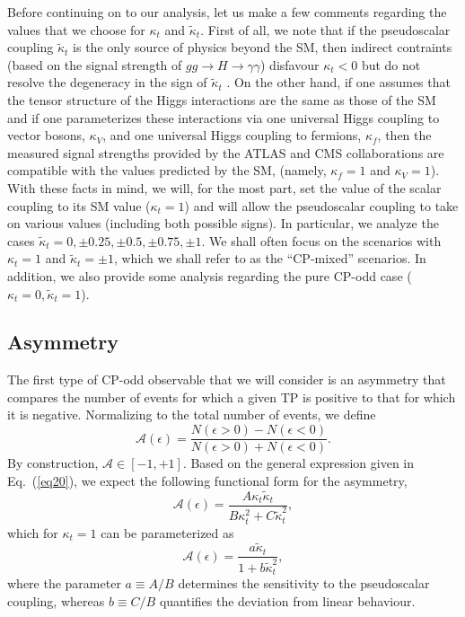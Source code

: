 \documentclass[aps,preprint,tightenlines,floatfix,superscriptaddress,nofootinbib,showpacs]{revtex4-1}
\def\beq{\begin{equation}}
\def\eeq{\end{equation}}
\def\kp{\kappa_t}
\def\kpt{\tilde{\kappa}_t}
\begin{document}
Before continuing on to our analysis, let us make a few comments
regarding the values that we choose for $\kp$ and $\kpt$.
First of all, we note that if the pseudoscalar
coupling $\kpt$ is the only source of physics beyond the SM,
then indirect contraints (based on the signal strength of $gg\to H \to \gamma\gamma$) 
disfavour $\kp < 0$ but do not
resolve the degeneracy in the sign of $\kpt$ \cite{Guadagnoli}. On
the other hand, if one assumes that the tensor structure of the
Higgs interactions are the
same as those of the SM and if one parameterizes these interactions via
one universal Higgs coupling to vector bosons, $\kappa_V$, and one
universal Higgs coupling to fermions, $\kappa_f$, then the measured signal
strengths provided by the ATLAS and CMS collaborations are compatible with
the values predicted by the SM, (namely, $\kappa_f=1$ and $\kappa_V=1$).
With these facts in mind, we will, for the most part,
set the value of the scalar coupling to its SM
value ($\kp=1$) and will allow the pseudoscalar coupling to take on
various values (including both possible signs). In particular, we
analyze the cases $\kpt=0,\pm 0.25, \pm 0.5, \pm 0.75,\pm 1$.
We shall often focus on the scenarios with $\kp=1$ and
$\kpt=\pm 1$, which we shall refer to as the ``$\mathrm{CP}$-mixed''
scenarios.
In addition, we also provide some analysis regarding the pure
$\mathrm{CP}$-odd case ($\kp=0,\kpt=1$).
\subsection{Asymmetry}
\label{sec3.1}

The first type of $\mathrm{CP}$-odd observable that we will consider is an
asymmetry that compares the number of events
for which a given TP is positive to that for which it is negative.
Normalizing to the total number of events, we define
%
\beq
\label{eq21}
\mathcal{A}(\epsilon)=\frac{N(\epsilon > 0)-N(\epsilon < 0)}{N(\epsilon > 0)+N(\epsilon < 0)}.
\eeq 
%
By construction, $\mathcal{A}\in [-1,+1]$.
Based on the general expression given in Eq.~(\ref{eq20}), we expect
the following functional form for the asymmetry,
%
\beq
\label{eq22}
\mathcal{A}(\epsilon)=\frac{A\kp\kpt}{B\kappa^2_t+C\tilde{\kappa}^2_t},
\eeq 
%
which for $\kp=1$ can be parameterized as
%
\beq
\label{eq23}
\mathcal{A}(\epsilon)=\frac{a\kpt}{1+b\tilde{\kappa}^2_t},
\eeq 
%
where the parameter $a\equiv A/B$ determines the sensitivity to the
pseudoscalar coupling, whereas $b\equiv C/B$ quantifies the deviation
from linear behaviour.
\end{document}
